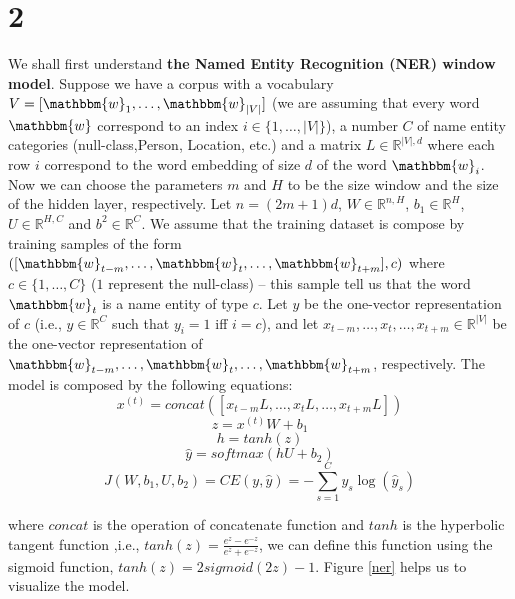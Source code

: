 \documentclass{article}
\newcommand{\wo}{\mathbbm{w}}
\begin{document}
\section{2}
We shall first understand \textbf{the Named Entity Recognition (NER) window model}. Suppose we have a corpus with a vocabulary $V =[\wo_{1}, \dots, \wo_{|V|}]$ (we are assuming that every word $\wo$ correspond to an index $i \in \{1, \dots, |V|\}$), a number $C$ of name entity categories (null-class,Person, Location, etc.) and a matrix $L \in \mathbb{R}^{|V|,d}$ where each row $i$ correspond to the word embedding of size $d$ of the word $\wo_{i}$. Now we can choose the parameters $m$ and $H$ to be the size window and the size of the hidden layer, respectively. Let $n = (2m+1)d$, $W \in \mathbb{R}^{n,H}$, $b_{1} \in \mathbb{R}^{H}$, $U \in \mathbb{R}^{H,C}$ and $b^{2} \in \mathbb{R}^{C}$. We assume that the training dataset is compose by training samples of the form $([\wo_{t-m}, \dots, \wo_{t}, \dots, \wo_{t+m}],c)$ where $c \in \{1, \dots, C\}$ ($1$ represent the null-class) -- this sample tell us that the word $ \wo_{t}$ is a name entity of type $c$. Let $y$ be the one-vector representation of $c$ (i.e., $y \in \mathbb{R}^{C}$ such that $y_{i} =1$ iff $i=c$), and let $x_{t-m}, \dots, x_{t}, \dots, x_{t+m}\in \mathbb{R}^{|V|}$ be the one-vector representation of $\wo_{t-m}, \dots, \wo_{t}, \dots, \wo_{t+m}$, respectively. The model is composed by the following equations:
\begin{equation}\label{eq:0}
x^{(t)} = concat([x_{t-m}L, \dots, x_{t}L, \dots, x_{t+m}L])
\end{equation}
\begin{equation}\label{eq:1}
z = x^{(t)}W + b_{1}
\end{equation}
 \begin{equation}\label{eq:2}
h = tanh(z)
\end{equation}
\begin{equation}\label{eq:3}
\hat{y} = softmax(hU + b_{2})
\end{equation}
\begin{equation}\label{eq:4}
J(W,b_{1},U,b_{2}) = CE(y,\hat{y}) = -\sum_{s=1}^{C} y_s  \log(\hat{y}_s)
\end{equation}

where $concat$ is the operation of concatenate function and $tanh$ is the hyperbolic tangent function ,i.e.,  $tanh(z) = \frac{e^{z} - e^{-z}}{e^{z} + e^{-z}}$, we can define this function using the sigmoid function, $tanh(z) = 2sigmoid(2z)-1$. Figure \ref{ner} helps us to visualize the model.
\end{document}
